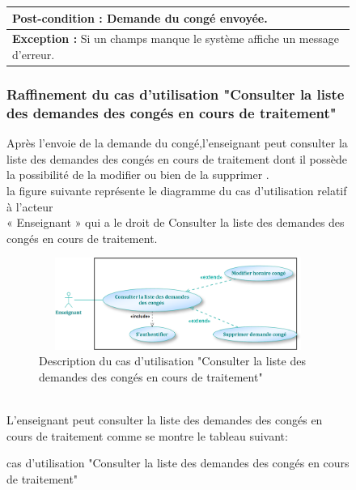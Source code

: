 \documentclass[12 pt]{report}
\begin{document}
\begin{figure}[h]
\begin{center}
\begin{table}[htbp]
\begin{center}
\begin{tabular}{|p{17 cm}|}
 \\
 \hline
 \cellcolor{MistyRose}  \textbf{Post-condition :} Demande du congé envoyée.\\
 \hline
\cellcolor{PowderBlue} \textbf{Exception :} Si un champs manque le système affiche un message d'erreur. \\
 \hline
\end{tabular}
\end{center}
\end{table}
\subsubsection{Raffinement du cas d’utilisation "Consulter la liste des demandes des congés en cours de traitement"}
Après l'envoie de la demande du congé,l'enseignant peut consulter la liste des demandes des congés en cours de traitement dont il possède la possibilité de la modifier ou bien de la supprimer  .\\
la figure suivante représente le diagramme du cas d’utilisation  relatif à l’acteur \\« Enseignant » qui a le droit de Consulter la liste des demandes des congés en cours de traitement.
\begin{figure}[h]
\begin{center}
\includegraphics[width= 12cm , height =3cm]{enseignant4.png}
\caption{Description du cas d'utilisation "Consulter la liste des demandes des congés en cours de traitement"}
\end{center}
\end{figure}
\\
L'enseignant peut consulter la liste des demandes des congés en cours de traitement comme se montre le tableau suivant:
\begin{table}[htbp]
\begin{center}
\caption{ cas d'utilisation "Consulter la liste des demandes des congés en cours de traitement"}


\end{center}
\end{table}
\end{center}
\end{figure}
\end{document}
